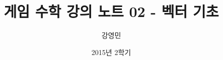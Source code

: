 \documentclass{beamer}
\title[게임수학 - 벡터기초]{ 게임 수학 강의 노트 02 - 벡터 기초}
\author{강영민}
\institute{동명대학교}
\date{2015년 2학기}
\begin{document}
\begin{frame}
  \titlepage
\end{frame}




\end{document}
